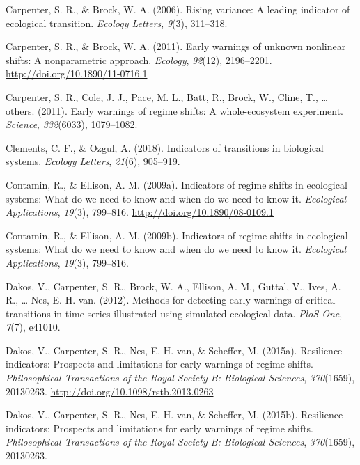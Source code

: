 \documentclass[12pt,twoside,openany]{reedthesis}
\begin{document}
\hypertarget{ref-carpenter2006rising}{}
Carpenter, S. R., \& Brock, W. A. (2006). Rising variance: A leading
indicator of ecological transition. \emph{Ecology Letters}, \emph{9}(3),
311--318.

\hypertarget{ref-carpenter_early_2011}{}
Carpenter, S. R., \& Brock, W. A. (2011). Early warnings of unknown
nonlinear shifts: A nonparametric approach. \emph{Ecology},
\emph{92}(12), 2196--2201. \url{http://doi.org/10.1890/11-0716.1}

\hypertarget{ref-carpenter2011early}{}
Carpenter, S. R., Cole, J. J., Pace, M. L., Batt, R., Brock, W., Cline,
T., \ldots{} others. (2011). Early warnings of regime shifts: A
whole-ecosystem experiment. \emph{Science}, \emph{332}(6033),
1079--1082.

\hypertarget{ref-clements2018indicators}{}
Clements, C. F., \& Ozgul, A. (2018). Indicators of transitions in
biological systems. \emph{Ecology Letters}, \emph{21}(6), 905--919.

\hypertarget{ref-contamin_indicators_2009}{}
Contamin, R., \& Ellison, A. M. (2009a). Indicators of regime shifts in
ecological systems: What do we need to know and when do we need to know
it. \emph{Ecological Applications}, \emph{19}(3), 799--816.
\url{http://doi.org/10.1890/08-0109.1}

\hypertarget{ref-contamin2009indicators}{}
Contamin, R., \& Ellison, A. M. (2009b). Indicators of regime shifts in
ecological systems: What do we need to know and when do we need to know
it. \emph{Ecological Applications}, \emph{19}(3), 799--816.

\hypertarget{ref-dakos_methods_2012}{}
Dakos, V., Carpenter, S. R., Brock, W. A., Ellison, A. M., Guttal, V.,
Ives, A. R., \ldots{} Nes, E. H. van. (2012). Methods for detecting
early warnings of critical transitions in time series illustrated using
simulated ecological data. \emph{PloS One}, \emph{7}(7), e41010.

\hypertarget{ref-dakos_resilience_2015}{}
Dakos, V., Carpenter, S. R., Nes, E. H. van, \& Scheffer, M. (2015a).
Resilience indicators: Prospects and limitations for early warnings of
regime shifts. \emph{Philosophical Transactions of the Royal Society B:
Biological Sciences}, \emph{370}(1659), 20130263.
\url{http://doi.org/10.1098/rstb.2013.0263}

\hypertarget{ref-dakos2015resilience}{}
Dakos, V., Carpenter, S. R., Nes, E. H. van, \& Scheffer, M. (2015b).
Resilience indicators: Prospects and limitations for early warnings of
regime shifts. \emph{Philosophical Transactions of the Royal Society B:
Biological Sciences}, \emph{370}(1659), 20130263.
\end{document}

